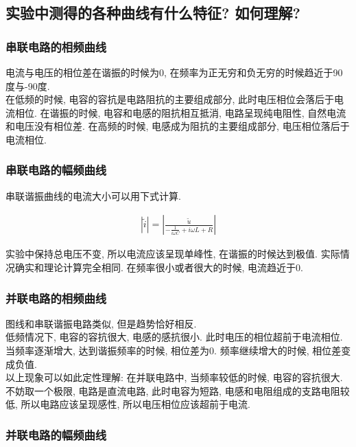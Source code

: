 \documentclass[a4paper,12pt,notitlepage]{article}
\begin{document}
\subsection{实验中测得的各种曲线有什么特征? 如何理解? }

\subsubsection{串联电路的相频曲线}

	电流与电压的相位差在谐振的时候为0, 在频率为正无穷和负无穷的时候趋近于90度与-90度. \\
	
	在低频的时候, 电容的容抗是电路阻抗的主要组成部分, 此时电压相位会落后于电流相位. 在谐振的时候, 电容和电感的阻抗相互抵消, 电路呈现纯电阻性, 自然电流和电压没有相位差. 在高频的时候, 电感成为阻抗的主要组成部分, 电压相位落后于电流相位. 

\subsubsection{串联电路的幅频曲线}

	串联谐振曲线的电流大小可以用下式计算.
	
\begin{align*}
	|\tilde{i}| = |\frac{\tilde{u}}{-\frac{1}{i\omega C} + i\omega L + R}|
\end{align*}

	实验中保持总电压不变, 所以电流应该呈现单峰性, 在谐振的时候达到极值. 实际情况确实和理论计算完全相同. 在频率很小或者很大的时候, 电流趋近于0.

\subsubsection{并联电路的相频曲线}

	图线和串联谐振电路类似, 但是趋势恰好相反. \\

	低频情况下, 电容的容抗很大, 电感的感抗很小. 此时电压的相位超前于电流相位. 当频率逐渐增大, 达到谐振频率的时候, 相位差为0. 频率继续增大的时候, 相位差变成负值. \\
	
	以上现象可以如此定性理解: 在并联电路中, 当频率较低的时候, 电容的容抗很大. 不妨取一个极限, 电路是直流电路, 此时电容为短路, 电感和电阻组成的支路电阻较低, 所以电路应该呈现感性, 所以电压相位应该超前于电流.

\subsubsection{并联电路的幅频曲线}
\end{document}
